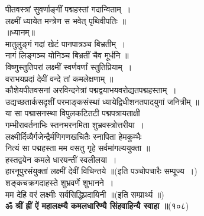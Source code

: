 \documentclass[twoside,top=1.7cm, bottom=1.7cm, outer=1cm,landscape, inner=1.5cm,a5paper,]{book}
\begin{document}
\begin{center}पीतवस्त्रां सुवर्णाङ्गीं पद्महस्तां गदान्विताम्~।\\
लक्ष्मीं ध्यायेत मन्त्रेण स भवेत् पृथिवीपतिः ॥\\[10pt]
॥ध्यानम्॥\\
मातुलुङ्गं गदां खेटं पानपात्रञ्च बिभ्रतीम्~।\\
नागं लिङ्गञ्च योनिञ्च बिभ्रतीं चैव मूर्धनि ॥\\[10pt]
विष्णुस्तुतिपरां लक्ष्मीं  स्वर्णवर्णां स्तुतिप्रियाम्~।\\
वराभयप्रदां देवीं वन्दे तां कमलेक्षणाम् ॥\\[10pt]
कौशेयपीतवसनां अरविन्दनेत्रां पद्मद्वयाभयवरोद्यतपद्महस्ताम्~।\\
उद्यच्छतार्कसदृशीं परमाङ्कसंस्थां ध्यायेद्विधीशनतपादयुगां जनित्रीम् ॥\\[10pt]
या सा पद्मासनस्था विपुलकटितटी पद्मपत्रायताक्षी\\
गम्भीरावर्तनाभिः स्तनभरनमिता शुभ्रवस्त्रोत्तरीया~।\\[10pt]
लक्ष्मीर्दिव्यैर्गजेन्द्रैर्मणिगणखचितैः स्नापिता हेमकुम्भैः\\
नित्यं सा पद्महस्ता मम वसतु गृहे सर्वमांगल्ययुक्ता ॥\\
\newpage
हस्तद्वयेन कमले धारयन्तीं स्वलीलया~।\\
हारनूपुरसंयुक्तां लक्ष्मीं देवीं विचिन्तये ॥(इति पञ्चोपचारैः सम्पूज्य~।)\\[10pt]
शङ्कचक्रगदाहस्ते शुभ्रवर्णे शुभानने~।\\
मम देहि वरं लक्ष्मीः सर्वसिद्धिप्रदायिनी ॥(इति सम्प्रार्थ्य ॥)\\[10pt]
{\bfseries ॐ श्रीं ह्रीं ऐं महालक्ष्म्यै कमलधारिण्यै सिंहवाहिन्यै स्वाहा ॥}(१०८)


\end{center}
\end{document}
